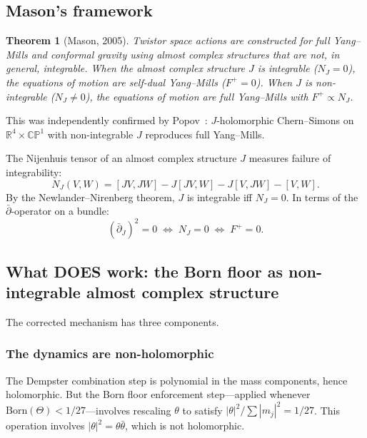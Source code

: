 \documentclass[11pt,a4paper]{article}
\newtheorem{theorem}{Theorem}[section]
\theoremstyle{definition}
\theoremstyle{remark}
\newcommand{\CP}{\mathbb{CP}}
\newcommand{\R}{\mathbb{R}}
\newcommand{\dbar}{\bar{\partial}}
\begin{document}
\subsection{Mason's framework}\label{sec:mason_framework}

\begin{theorem}[Mason, 2005]\label{thm:mason_orig}
Twistor space actions are constructed for full Yang--Mills and conformal gravity using almost complex structures that are not, in general, integrable. When the almost complex structure $J$ is integrable ($N_J=0$), the equations of motion are self-dual Yang--Mills ($F^+=0$). When $J$ is non-integrable ($N_J\neq 0$), the equations of motion are full Yang--Mills with $F^+\propto N_J$.
\end{theorem}

This was independently confirmed by Popov~\cite{Popov2021}: $J$-holomorphic Chern--Simons on $\R^4\times\CP^1$ with non-integrable $J$ reproduces full Yang--Mills.

The Nijenhuis tensor of an almost complex structure $J$ measures failure of integrability:
\begin{equation}
N_J(V,W)=[JV,JW]-J[JV,W]-J[V,JW]-[V,W].
\end{equation}
By the Newlander--Nirenberg theorem, $J$ is integrable iff $N_J=0$. In terms of the $\dbar$-operator on a bundle:
\begin{equation}\label{eq:dbar_sq}
(\dbar_J)^2=0\;\Longleftrightarrow\;N_J=0\;\Longleftrightarrow\;F^+=0.
\end{equation}


\subsection{What DOES work: the Born floor as non-integrable almost complex structure}

The corrected mechanism has three components.

\subsubsection{The dynamics are non-holomorphic}

The Dempster combination step is polynomial in the mass components, hence holomorphic. But the Born floor enforcement step---applied whenever $\mathrm{Born}(\Theta)<1/27$---involves rescaling $\theta$ to satisfy $|\theta|^2/\sum|m_j|^2=1/27$. This operation involves $|\theta|^2=\theta\bar{\theta}$, which is not holomorphic.
\end{document}
